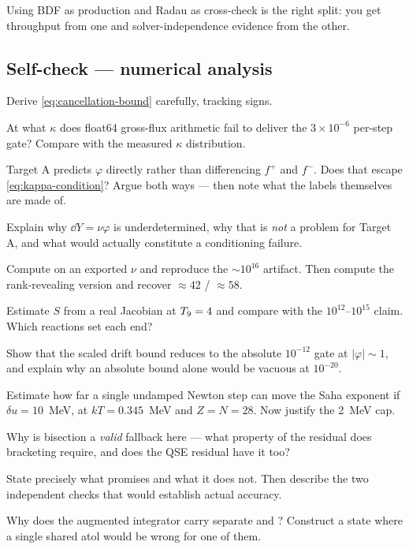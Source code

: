 Using BDF as production and Radau as cross-check is the right split: you get
throughput from one and solver-independence evidence from the other.

\subsection*{Self-check --- numerical analysis}
\label{sec:selfcheck-numerics}

\begin{selfcheck}
\item Derive \eqref{eq:cancellation-bound} carefully, tracking signs.
\item At what $\kappa$ does float64 gross-flux arithmetic fail to deliver the
      $3\times10^{-6}$ per-step \Ye{} gate? Compare with the measured $\kappa$
      distribution.
\item Target A predicts $\varphi$ directly rather than differencing $f^+$ and
      $f^-$. Does that escape \eqref{eq:kappa-condition}? Argue both ways ---
      then note what the labels themselves are made of.
\item Explain why $\dd Y = \nu\varphi$ is underdetermined, why that is \emph{not}
      a problem for Target A, and what would actually constitute a conditioning
      failure.
\item Compute  on an exported $\nu$ and reproduce the
      ${\sim}10^{16}$ artifact. Then compute the rank-revealing version and
      recover $\approx 42$ / $\approx 58$.
\item Estimate $S$ from a real Jacobian at $T_{9} = 4$ and compare with the
      $10^{12}$--$10^{15}$ claim. Which reactions set each end?
      \label{sc:jacobian}
\item Show that the scaled drift bound reduces to the absolute $10^{-12}$ gate at
      $|\varphi| \sim 1$, and explain why an absolute bound alone would be
      vacuous at $10^{-20}$.
\item Estimate how far a single undamped Newton step can move the Saha exponent
      if $\delta u = 10$~MeV, at $kT = 0.345$~MeV and $Z = N = 28$. Now justify
      the 2~MeV cap.
\item Why is bisection a \emph{valid} fallback here --- what property of the
      residual does bracketing require, and does the QSE residual have it too?
\item State precisely what  promises and what it does not. Then
      describe the two independent checks that would establish actual accuracy.
\item Why does the augmented integrator carry separate  and
      ? Construct a state where a single shared atol would be
      wrong for one of them.
\end{selfcheck}

